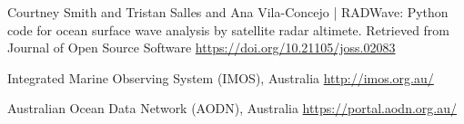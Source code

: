 \documentclass[12pt]{article}
\begin{document}
\begin{thebibliography}{9}

    Courtney Smith and Tristan Salles and Ana Vila-Concejo | RADWave: Python code for ocean surface wave analysis by     satellite radar altimete. Retrieved from Journal of Open Source Software 
    {\url{https://doi.org/10.21105/joss.02083}}
   
	Integrated Marine Observing System (IMOS), Australia
	{\url{http://imos.org.au/}}
	

	Australian Ocean Data Network (AODN), Australia
	{\url{https://portal.aodn.org.au/}}


\end{thebibliography}
\end{document}
